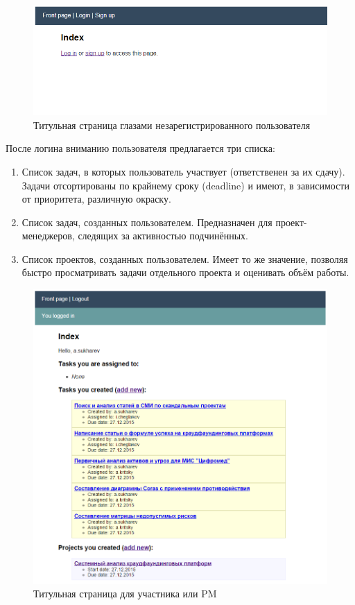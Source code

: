 \documentclass[a4paper, 14pt]{extarticle}
\begin{document}
\begin{figure}[!htb]
  \centering
    \includegraphics[scale=0.75]{../shared_images/frontend/title-not-logged-in.png}
   \caption{Титульная страница глазами незарегистрированного пользователя}
    \label{fig:start}
\end{figure}

После логина вниманию пользователя предлагается три списка:

\begin{enumerate}
\item Список задач, в которых пользователь участвует (ответственен за их сдачу). Задачи отсортированы по крайнему сроку (deadline) и имеют, в зависимости от приоритета, различную окраску.
\item Список задач, созданных пользователем. Предназначен для проект-менеджеров, следящих за активностью подчинённых.
\item Список проектов, созданных пользователем. Имеет то же значение, позволяя быстро просматривать задачи отдельного проекта и оценивать объём работы.
\end{enumerate}

\begin{figure}[!htb]
  \centering
    \includegraphics[scale=0.8]{../shared_images/frontend/title-logged-in.png}
   \caption{Титульная страница для участника или PM}
    \label{fig:start}
\end{figure}
\end{document}
